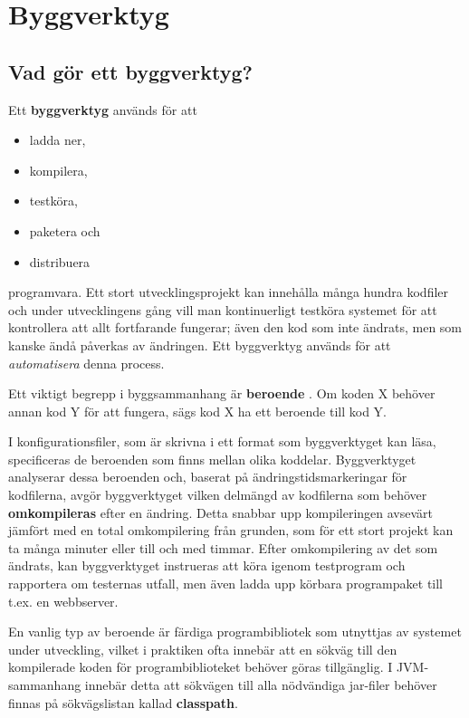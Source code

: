 
\newcommand{\sbt}{\texttt{sbt}}

\chapter{Byggverktyg}\label{appendix:build}

\section{Vad gör ett byggverktyg?}

Ett \textbf{byggverktyg}  används för att
\begin{itemize}
\item ladda ner,
\item kompilera,
\item testköra,
\item paketera och
\item distribuera
\end{itemize}
programvara. Ett stort utvecklingsprojekt kan innehålla många hundra kodfiler och under utvecklingens gång vill man kontinuerligt testköra systemet för att kontrollera att allt fortfarande fungerar; även den kod som inte ändrats, men som kanske ändå påverkas av ändringen. Ett byggverktyg används för att \textit{automatisera} denna process.

Ett viktigt begrepp i byggsammanhang är \textbf{beroende} . Om koden X behöver annan kod Y för att fungera, sägs kod X ha ett beroende till kod Y.

I konfigurationsfiler, som är skrivna i ett format som byggverktyget kan läsa, specificeras de beroenden som finns mellan olika koddelar. Byggverktyget analyserar dessa beroenden och, baserat på ändringstidsmarkeringar för kodfilerna, avgör byggverktyget vilken delmängd av kodfilerna som behöver \textbf{omkompileras} efter en ändring. Detta snabbar upp kompileringen avsevärt jämfört med en total omkompilering från grunden, som för ett stort projekt kan ta många minuter eller till och med timmar. Efter omkompilering av det som ändrats, kan byggverktyget instrueras att köra igenom testprogram och rapportera om testernas utfall, men även ladda upp körbara programpaket till t.ex. en webbserver.


En vanlig typ av beroende är färdiga programbibliotek som utnyttjas av systemet under utveckling, vilket i praktiken ofta innebär att en sökväg till den kompilerade koden för programbiblioteket behöver göras tillgänglig. I JVM-sammanhang innebär detta att sökvägen till alla nödvändiga jar-filer behöver finnas på sökvägslistan kallad \textbf{classpath}.

